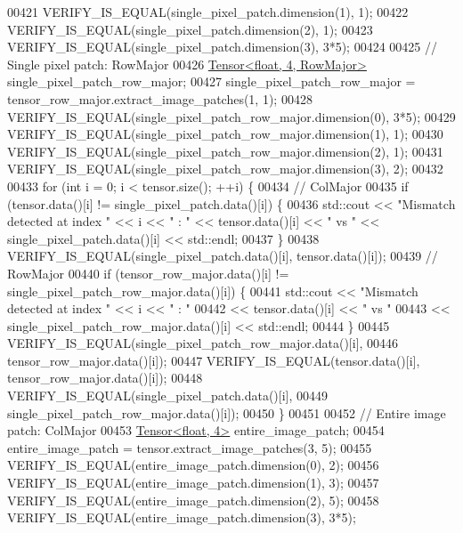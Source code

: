 \begin{DoxyCode}
00421   VERIFY\_IS\_EQUAL(single\_pixel\_patch.dimension(1), 1);
00422   VERIFY\_IS\_EQUAL(single\_pixel\_patch.dimension(2), 1);
00423   VERIFY\_IS\_EQUAL(single\_pixel\_patch.dimension(3), 3*5);
00424 
00425   \textcolor{comment}{// Single pixel patch: RowMajor}
00426   \hyperlink{class_eigen_1_1_tensor}{Tensor<float, 4, RowMajor>} single\_pixel\_patch\_row\_major;
00427   single\_pixel\_patch\_row\_major = tensor\_row\_major.extract\_image\_patches(1, 1);
00428   VERIFY\_IS\_EQUAL(single\_pixel\_patch\_row\_major.dimension(0), 3*5);
00429   VERIFY\_IS\_EQUAL(single\_pixel\_patch\_row\_major.dimension(1), 1);
00430   VERIFY\_IS\_EQUAL(single\_pixel\_patch\_row\_major.dimension(2), 1);
00431   VERIFY\_IS\_EQUAL(single\_pixel\_patch\_row\_major.dimension(3), 2);
00432 
00433   \textcolor{keywordflow}{for} (\textcolor{keywordtype}{int} i = 0; i < tensor.size(); ++i) \{
00434     \textcolor{comment}{// ColMajor}
00435     \textcolor{keywordflow}{if} (tensor.data()[i] != single\_pixel\_patch.data()[i]) \{
00436       std::cout << \textcolor{stringliteral}{"Mismatch detected at index "} << i << \textcolor{stringliteral}{" : "} << tensor.data()[i] << \textcolor{stringliteral}{" vs "} << 
      single\_pixel\_patch.data()[i] << std::endl;
00437     \}
00438     VERIFY\_IS\_EQUAL(single\_pixel\_patch.data()[i], tensor.data()[i]);
00439     \textcolor{comment}{// RowMajor}
00440     \textcolor{keywordflow}{if} (tensor\_row\_major.data()[i] != single\_pixel\_patch\_row\_major.data()[i]) \{
00441       std::cout << \textcolor{stringliteral}{"Mismatch detected at index "} << i << \textcolor{stringliteral}{" : "}
00442            << tensor.data()[i] << \textcolor{stringliteral}{" vs "}
00443            << single\_pixel\_patch\_row\_major.data()[i] << std::endl;
00444     \}
00445     VERIFY\_IS\_EQUAL(single\_pixel\_patch\_row\_major.data()[i],
00446                     tensor\_row\_major.data()[i]);
00447     VERIFY\_IS\_EQUAL(tensor.data()[i], tensor\_row\_major.data()[i]);
00448     VERIFY\_IS\_EQUAL(single\_pixel\_patch.data()[i],
00449                     single\_pixel\_patch\_row\_major.data()[i]);
00450   \}
00451 
00452   \textcolor{comment}{// Entire image patch: ColMajor}
00453   \hyperlink{class_eigen_1_1_tensor}{Tensor<float, 4>} entire\_image\_patch;
00454   entire\_image\_patch = tensor.extract\_image\_patches(3, 5);
00455   VERIFY\_IS\_EQUAL(entire\_image\_patch.dimension(0), 2);
00456   VERIFY\_IS\_EQUAL(entire\_image\_patch.dimension(1), 3);
00457   VERIFY\_IS\_EQUAL(entire\_image\_patch.dimension(2), 5);
00458   VERIFY\_IS\_EQUAL(entire\_image\_patch.dimension(3), 3*5);

\end{DoxyCode}
